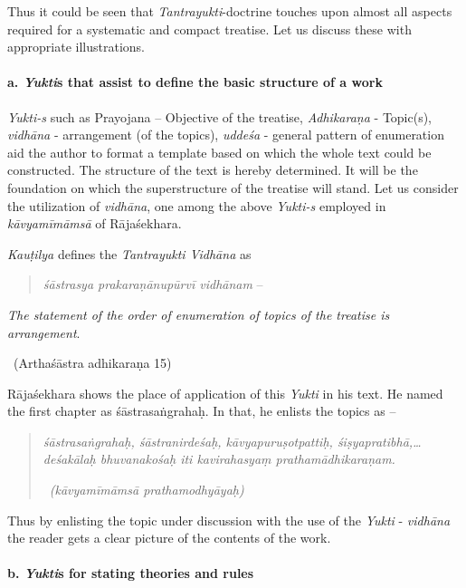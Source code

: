 Thus it could be seen that \textit{Tantrayukti}-doctrine touches upon almost all aspects required for a systematic and compact treatise. Let us discuss these with appropriate illustrations.

\paragraph*{a. \textit{Yukti}s that assist to define the basic structure of a work}

\textit{Yukti-s} such as Prayojana – Objective of the treatise, \textit{Adhikaraṇa} - Topic(s), \textit{vidhāna} - arrangement (of the topics), \textit{uddeśa} - general pattern of enumeration aid the author to format a template based on which the whole text could be constructed. The structure of the text is hereby determined. It will be the foundation on which the superstructure of the treatise will stand. Let us consider the utilization of \textit{vidhāna}, one among the above \textit{Yukti-s} employed in \textit{kāvyamīmāmsā} of Rājaśekhara.

\textit{Kauṭilya} defines the \textit{Tantrayukti Vidhāna} as

\begin{verse}
\textit{śāstrasya prakaraṇānupūrvī vidhānam} –
\end{verse}

\begin{myquote}
\textit{The statement of the order of enumeration of topics of the treatise is arrangement}.

~\hfill (Arthaśāstra adhikaraṇa 15)
\end{myquote}

Rājaśekhara shows the place of application of this \textit{Yukti} in his text. He named the first chapter as śāstrasaṅgrahaḥ. In that, he enlists the topics as –

\begin{quote}
\textit{śāstrasaṅgrahaḥ, śāstranirdeśaḥ, kāvyapuruṣotpattiḥ, śiṣyapra\-tibhā,…deśakālaḥ bhuvanakośaḥ iti kavirahasyaṃ prathamādhikaraṇam.}

~\hfill \textit{(kāvyamīmāmsā prathamodhyāyaḥ)}
\end{quote}

Thus by enlisting the topic under discussion with the use of the \textit{Yukti} - \textit{vidhāna} the reader gets a clear picture of the contents of the work.


\paragraph*{b. \textit{Yukti}s for stating theories and rules}

